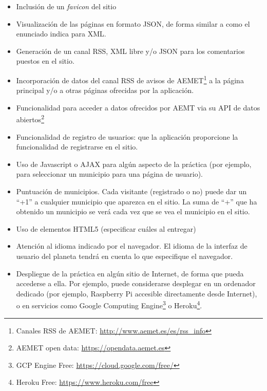 \begin{itemize}
  \item Inclusión de un \emph{favicon} del sitio
  
  \item Visualización de las páginas en formato JSON, de forma similar a como el enunciado indica para XML.

  \item Generación de un canal RSS, XML libre y/o JSON para los comentarios puestos en el sitio.

  \item Incorporación de datos del canal RSS de avisos de AEMET\footnote{Canales RSS de AEMET: \url{http://www.aemet.es/es/rss_info}} a la página principal y/o a otras páginas ofrecidas por la aplicación.
    
  \item Funcionalidad para acceder a datos ofrecidos por AEMT via su API de datos abiertos\footnote{AEMET open data: \url{https://opendata.aemet.es}}
  
  \item Funcionalidad de registro de usuarios: que la aplicación proporcione la funcionalidad de registrarse en el sitio.
  
  \item Uso de Javascript o AJAX para algún aspecto de la práctica (por ejemplo, para seleccionar un municipio para una página de usuario).

  \item Puntuación de municipios. Cada visitante (registrado o no) puede dar un ``+1'' a cualquier municipio que aparezca en el sitio. La suma de ``+'' que ha obtenido un municipio se verá cada vez que se vea el municipio en el sitio.
  
  \item Uso de elementos HTML5 (especificar cuáles al entregar)

  \item Atención al idioma indicado por el navegador. El idioma de la interfaz de usuario del planeta tendrá en cuenta lo que especifique el navegador.

  \item Despliegue de la práctica en algún sitio de Internet, de forma que pueda accederse a ella. Por ejemplo, puede considerarse desplegar en un ordenador dedicado (por ejemplo, Raspberry Pi accesible directamente desde Internet), o en servicios como Google Computing Engine\footnote{GCP Engine Free: \url{https://cloud.google.com/free/}} o Heroku\footnote{Heroku Free: \url{https://www.heroku.com/free}}.
\end{itemize}

